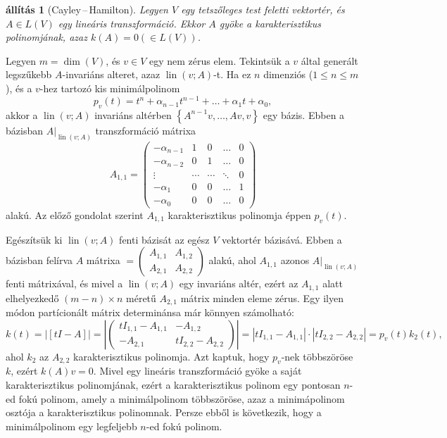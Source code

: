 \documentclass[9pt, a4paper, showtrims]{memoir}
\makeatletter
\renewenvironment{proof}[1][\proofname]
    {\par\pushQED{\qed}%
    \normalfont \topsep6\p@\@plus6\p@\relax
    \trivlist
    \item[\hskip\labelsep
        \itshape
    #1\@addpunct{:}]\ignorespaces}
    {\popQED\endtrivlist\@endpefalse}
\theoremstyle{plain}
\newtheorem{proposition}{állítás}[chapter]
\theoremstyle{remark}
\theoremstyle{definition}
\DeclareMathOperator{\lin}{lin}
\makeatother
\begin{document}
\begin{proposition}[Cayley\,--\,Hamilton]
	Legyen $V$ egy tetszőleges test feletti vektortér,
	és $A\in L\left( V \right)$ egy lineáris transzformáció.
	Ekkor $A$ gyöke a karakterisztikus polinomjának,
	azaz $k\left( A \right)=0
		(\in L\left( V \right))$.
\end{proposition}
\begin{proof}
	Legyen $m=\dim(V)$, és $v\in V$ egy nem zérus elem.
	Tekintsük a $v$ által generált legszűkebb $A$-invariáns alteret, azaz
	$\lin\left( v;A \right)$-t.
	Ha ez $n$ dimenziós ($1\leq n\leq m$),
	és a $v$-hez tartozó kis minimálpolinom
	\[
		p_v\left( t \right)
		=
		t^{n}+\alpha_{n-1}t^{n-1}+\dots+\alpha_1t+\alpha_0,
	\]
	akkor a
	$\lin\left( v;A \right)$ invariáns altérben
	$\left\{ A^{n-1}v,\ldots,Av,v \right\}$ egy bázis.
	Ebben a bázisban $A|_{\lin\left( v;A \right)}$ transzformáció mátrixa
	\[
		A_{1,1}=
		\begin{pmatrix}
			-\alpha_{n-1} & 1      & 0      & \dots  & 0 \\
			-\alpha_{n-2} & 0      & 1      & \dots  & 0 \\
			\vdots        & \cdots & \cdots & \ddots & 0 \\
			-\alpha_1     & 0      & 0      & \dots  & 1 \\
			-\alpha_0     & 0      & 0      & \dots  & 0
		\end{pmatrix}
	\]
	alakú.
	Az előző gondolat szerint $A_{1,1}$ karakterisztikus polinomja éppen $p_v\left( t \right)$.

	Egészítsük ki $\lin\left( v;A \right)$ fenti bázisát az egész $V$ vektortér bázisává.
	Ebben a bázisban felírva $A$ mátrixa
	\begin{math}
		[A]=
		\begin{pmatrix}
			A_{1,1} & A_{1,2} \\
			A_{2,1} & A_{2,2}
		\end{pmatrix}
	\end{math}
	alakú, ahol $A_{1,1}$ azonos $A|_{\lin\left( v;A \right)}$ fenti mátrixával, és mivel a
	$\lin\left( v;A \right)$ egy invariáns altér,
	ezért az $A_{1,1}$ alatt elhelyezkedő $\left( m-n \right)\times n$ méretű $A_{2,1}$ mátrix minden eleme zérus.
	Egy ilyen módon partícionált mátrix determinánsa már könnyen számolható:
	\[
		k\left( t \right)=
		|[tI-A]|
		=
		\left|
		\begin{pmatrix}
			tI_{1,1}-A_{1,1} & -A_{1,2}         \\
			-A_{2,1}         & tI_{2,2}-A_{2,2}
		\end{pmatrix}
		\right|
		=
		|tI_{1,1}-A_{1,1}|\cdot|tI_{2,2}-A_{2,2}|
		=
		p_v\left( t \right)k_2\left( t \right),
	\]
	ahol $k_2$ az $A_{2,2}$ karakterisztikus polinomja.
	Azt kaptuk, hogy $p_v$-nek többszöröse $k$,
	ezért $k\left( A \right)v=0$.
\end{proof}
Mivel egy lineáris transzformáció gyöke a saját karakterisztikus polinomjának,
ezért a karakterisztikus polinom egy pontosan $n$-ed fokú polinom,
amely a minimálpolinom többszöröse,
azaz a minimápolinom osztója a karakterisztikus polinomnak.
Persze ebből is következik, hogy a minimálpolinom egy legfeljebb $n$-ed fokú polinom.
\end{document}
